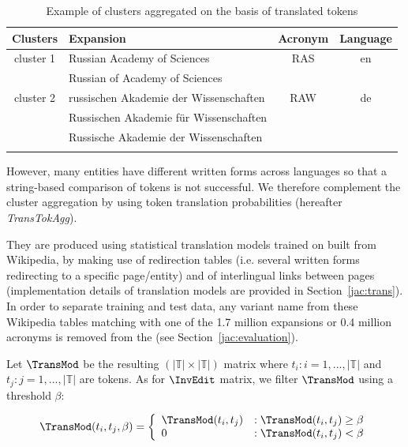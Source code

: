 \documentclass[output=paper]{langsci/langscibook}
\begin{document}
\begin{table}[h]
\centering
\begin{tabular}{clcc}\lsptoprule
Clusters    &  Expansion  & Acronym  &  Language \\
\midrule
cluster 1   &  Russian Academy of Sciences     &  RAS  & en  \\
                    &  Russian of Academy of Sciences   &         &     \\
\midrule
cluster 2   &  russischen Akademie der Wissenschaften   &  RAW  & de \\
                    &  Russischen Akademie für Wissenschaften  &          &    \\
                    &  Russische Akademie der Wissenschaften    &         &    \\
\lspbottomrule
\end{tabular}
\caption{Example of clusters aggregated on the basis of translated tokens}
\label{jac:tab:translated token aggregation}
\end{table}


However, many entities have different written forms across languages
so that a string-based comparison of tokens is not successful. We
therefore complement the cluster aggregation by using token
translation probabilities (hereafter \textit{TransTokAgg}).

They are produced using statistical translation models trained on
 built from Wikipedia, by making use of redirection
tables (i.e.  several written forms redirecting to a specific
page/entity) and of interlingual links between pages (implementation
details of translation models are provided in Section~\ref{jac:trans}).
In order to separate training and test data, any variant name from
these Wikipedia tables matching with one of the 1.7 million expansions
or 0.4 million acronyms is removed from the  (see
Section~\ref{jac:evaluation}).

Let $\TransMod$ be the resulting $(|\mathbb{T}| \times |\mathbb{T}|)$
 matrix where $t_i : i = 1,...,|\mathbb{T}|$ and $t_j
: j = 1,...,|\mathbb{T}|$ are tokens.  As for $\InvEdit$ matrix, we
filter $\TransMod$ using a threshold $\beta$:

\begin{equation}
\TransMod(t_i,t_j,\beta) =
\left\{
  \begin{array}{lr}
    \TransMod(t_i,t_j) & : \TransMod(t_i,t_j) \ge \beta\\
    0 & : \TransMod(t_i,t_j) < \beta
  \end{array}
\right.
\end{equation}
\end{document}
